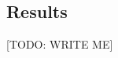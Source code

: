 \documentclass{article} %
\begin{document}

\subsection{Results}
\label{sec:results}

[TODO: WRITE ME]
\end{document}
